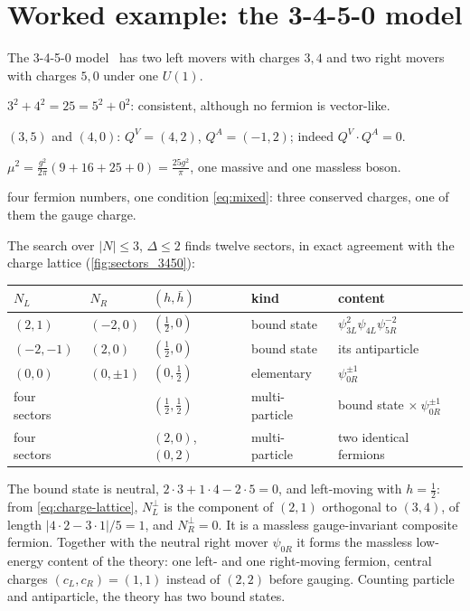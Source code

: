 \section{Worked example: the 3-4-5-0 model}
The 3-4-5-0 model~\cite{WangWen2019,Tong2022} has two left movers with charges $3,4$ and two right movers with
charges $5,0$ under one $U(1)$.
\begin{description}[leftmargin=1.5em,style=nextline]
  \item[Anomaly] $3^2 + 4^2 = 25 = 5^2 + 0^2$: consistent, although no fermion is vector-like.
  \item[Pairing] $(3,5)$ and $(4,0)$: $Q^V = (4,2)$, $Q^A = (-1,2)$; indeed $Q^V\cdot Q^A = 0$.
  \item[Meson] $\mu^2 = \frac{g^2}{2\pi}(9 + 16 + 25 + 0) = \frac{25g^2}{\pi}$, one massive and one massless boson.
  \item[Global symmetries] four fermion numbers, one condition \eqref{eq:mixed}: three conserved charges, one of
    them the gauge charge.
\end{description}
The search over $|N|\leq3$, $\Delta\leq2$ finds twelve sectors, in exact agreement with the charge lattice
(\cref{fig:sectors_3450}):
\begin{center}
\begin{tabular}{@{}lllll@{}}
\toprule
$N_L$ & $N_R$ & $(h,\bar h)$ & kind & content \\
\midrule
$(2,1)$ & $(-2,0)$ & $(\frac12,0)$ & bound state & $\psi_{3L}^2\psi_{4L}\psi_{5R}^{-2}$ \\
$(-2,-1)$ & $(2,0)$ & $(\frac12,0)$ & bound state & its antiparticle \\
$(0,0)$ & $(0,\pm1)$ & $(0,\frac12)$ & elementary & $\psi_{0R}^{\pm1}$ \\
four sectors & & $(\frac12,\frac12)$ & multi-particle & bound state $\times\ \psi_{0R}^{\pm1}$ \\
four sectors & & $(2,0)$, $(0,2)$ & multi-particle & two identical fermions \\
\bottomrule
\end{tabular}
\end{center}
The bound state is neutral, $2\cdot3 + 1\cdot4 - 2\cdot5 = 0$, and left-moving with $h = \frac12$: from
\eqref{eq:charge-lattice}, $N_L^\perp$ is the component of $(2,1)$ orthogonal to $(3,4)$, of length
$|4\cdot2 - 3\cdot1|/5 = 1$, and $N_R^\perp = 0$. It is a massless gauge-invariant composite fermion. Together with
the neutral right mover $\psi_{0R}$ it forms the massless low-energy content of the theory: one left- and one
right-moving fermion, central charges $(c_L, c_R) = (1,1)$ instead of $(2,2)$ before gauging. Counting particle and
antiparticle, the theory has two bound states.

